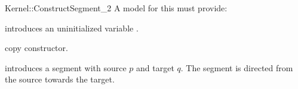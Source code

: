 \begin{ccRefFunctionObjectConcept}{Kernel::ConstructSegment_2}
A model for this must provide:




\ccHidden {}
             {introduces an uninitialized variable .}

\ccHidden {}
            {copy constructor.}

            {introduces a segment  with source $p$
             and target $q$. The segment is directed from the source towards
             the target.}

\ccSeeAlso
{}\\

\end{ccRefFunctionObjectConcept}
